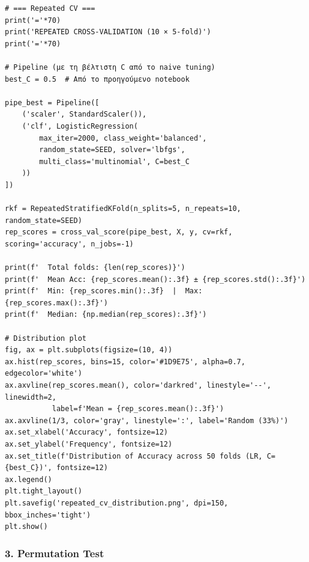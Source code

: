 \begin{lstlisting}
# === Repeated CV ===
print('='*70)
print('REPEATED CROSS-VALIDATION (10 × 5-fold)')
print('='*70)
 
# Pipeline (με τη βέλτιστη C από το naive tuning)
best_C = 0.5  # Από το προηγούμενο notebook
 
pipe_best = Pipeline([
    ('scaler', StandardScaler()),
    ('clf', LogisticRegression(
        max_iter=2000, class_weight='balanced',
        random_state=SEED, solver='lbfgs',
        multi_class='multinomial', C=best_C
    ))
])
 
rkf = RepeatedStratifiedKFold(n_splits=5, n_repeats=10, random_state=SEED)
rep_scores = cross_val_score(pipe_best, X, y, cv=rkf, scoring='accuracy', n_jobs=-1)
 
print(f'  Total folds: {len(rep_scores)}')
print(f'  Mean Acc: {rep_scores.mean():.3f} ± {rep_scores.std():.3f}')
print(f'  Min: {rep_scores.min():.3f}  |  Max: {rep_scores.max():.3f}')
print(f'  Median: {np.median(rep_scores):.3f}')
 
# Distribution plot
fig, ax = plt.subplots(figsize=(10, 4))
ax.hist(rep_scores, bins=15, color='#1D9E75', alpha=0.7, edgecolor='white')
ax.axvline(rep_scores.mean(), color='darkred', linestyle='--', linewidth=2,
           label=f'Mean = {rep_scores.mean():.3f}')
ax.axvline(1/3, color='gray', linestyle=':', label='Random (33%)')
ax.set_xlabel('Accuracy', fontsize=12)
ax.set_ylabel('Frequency', fontsize=12)
ax.set_title(f'Distribution of Accuracy across 50 folds (LR, C={best_C})', fontsize=12)
ax.legend()
plt.tight_layout()
plt.savefig('repeated_cv_distribution.png', dpi=150, bbox_inches='tight')
plt.show()
\end{lstlisting}
 
\subsubsection*{3. Permutation Test}
 
